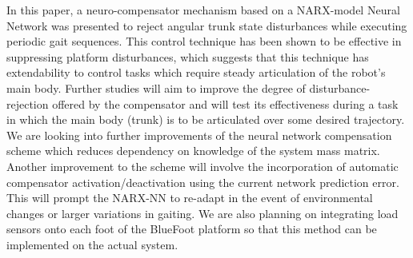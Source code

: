 
In this paper, a neuro-compensator mechanism based on a NARX-model Neural Network was presented
 to reject angular trunk state disturbances while executing
periodic gait sequences. This control technique has been shown to be effective in suppressing
platform disturbances, which suggests that this technique has extendability to control tasks which 
require steady articulation of the robot's main body. Further studies will aim to improve the
degree of disturbance-rejection offered by the compensator and will test its effectiveness
during a task in which the main body (trunk) is to be articulated over some desired trajectory. We are looking into
further improvements of the neural network compensation scheme which reduces dependency on
knowledge of the system mass matrix. Another improvement to the scheme will involve the incorporation 
of automatic compensator activation/deactivation using the current network prediction error. This will
prompt the  NARX-NN to re-adapt in the event of environmental changes or larger variations in gaiting.
We are also planning on integrating load sensors onto each foot of the BlueFoot platform so that this method 
can be implemented on the actual system.